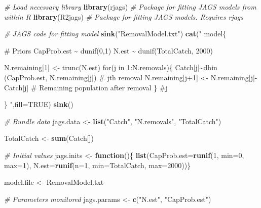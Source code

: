 \documentclass[
]{krantz}
\makeatletter
\newenvironment{Shaded}{\begin{snugshade}}{\end{snugshade}}
\newcommand{\AttributeTok}[1]{\textcolor[rgb]{0.27,0.27,0.27}{#1}}
\newcommand{\CommentTok}[1]{\textcolor[rgb]{0.37,0.37,0.37}{\textit{#1}}}
\newcommand{\ConstantTok}[1]{\textcolor[rgb]{0.37,0.37,0.37}{#1}}
\newcommand{\ControlFlowTok}[1]{\textcolor[rgb]{0.27,0.27,0.27}{\textbf{#1}}}
\newcommand{\DecValTok}[1]{\textcolor[rgb]{0.06,0.06,0.06}{#1}}
\newcommand{\FunctionTok}[1]{\textcolor[rgb]{0.27,0.27,0.27}{\textbf{#1}}}
\newcommand{\NormalTok}[1]{#1}
\newcommand{\OtherTok}[1]{\textcolor[rgb]{0.37,0.37,0.37}{#1}}
\newcommand{\StringTok}[1]{\textcolor[rgb]{0.5,0.5,0.5}{#1}}
\newenvironment{kframe}{%
\medskip{}
\setlength{\fboxsep}{.8em}
 \def\at@end@of@kframe{}%
 \ifinner\ifhmode%
  \def\at@end@of@kframe{\end{minipage}}%
  \begin{minipage}{\columnwidth}%
 \fi\fi%
 \def\FrameCommand##1{\hskip\@totalleftmargin \hskip-\fboxsep
 \colorbox{shadecolor}{##1}\hskip-\fboxsep
     \hskip-\linewidth \hskip-\@totalleftmargin \hskip\columnwidth}%
 \MakeFramed {\advance\hsize-\width
   \@totalleftmargin\z@ \linewidth\hsize
   \@setminipage}}%
 {\par\unskip\endMakeFramed%
 \at@end@of@kframe}
\renewenvironment{Shaded}{\begin{kframe}}{\end{kframe}}
\makeatother
\begin{document}
\begin{Shaded}
\begin{Highlighting}[]
\CommentTok{\# Load necessary library}
\FunctionTok{library}\NormalTok{(rjags)   }\CommentTok{\# Package for fitting JAGS models from within R}
\FunctionTok{library}\NormalTok{(R2jags)  }\CommentTok{\# Package for fitting JAGS models. Requires rjags}

\CommentTok{\# JAGS code for fitting model}
\FunctionTok{sink}\NormalTok{(}\StringTok{"RemovalModel.txt"}\NormalTok{)}
  \FunctionTok{cat}\NormalTok{(}\StringTok{"}
\StringTok{model\{}

\StringTok{\# Priors}
\StringTok{ CapProb.est \textasciitilde{} dunif(0,1)}
\StringTok{ N.est \textasciitilde{} dunif(TotalCatch, 2000)}

\StringTok{ N.remaining[1] \textless{}{-} trunc(N.est)}
\StringTok{ for(j in 1:N.removals)\{}
\StringTok{      Catch[j]\textasciitilde{}dbin (CapProb.est, N.remaining[j]) \# jth removal}
\StringTok{      N.remaining[j+1] \textless{}{-} N.remaining[j]{-}Catch[j] \# Remaining population after removal}
\StringTok{  \} \#j}

\StringTok{\}}
\StringTok{      "}\NormalTok{,}\AttributeTok{fill=}\ConstantTok{TRUE}\NormalTok{)}
  \FunctionTok{sink}\NormalTok{()}

     \CommentTok{\# Bundle data}
\NormalTok{  jags.data }\OtherTok{\textless{}{-}} \FunctionTok{list}\NormalTok{(}\StringTok{"Catch"}\NormalTok{, }\StringTok{"N.removals"}\NormalTok{, }\StringTok{"TotalCatch"}\NormalTok{)}

\NormalTok{  TotalCatch }\OtherTok{\textless{}{-}} \FunctionTok{sum}\NormalTok{(Catch[])}

  \CommentTok{\# Initial values}
\NormalTok{  jags.inits }\OtherTok{\textless{}{-}} \ControlFlowTok{function}\NormalTok{()\{ }\FunctionTok{list}\NormalTok{(}\AttributeTok{CapProb.est=}\FunctionTok{runif}\NormalTok{(}\DecValTok{1}\NormalTok{, }\AttributeTok{min=}\DecValTok{0}\NormalTok{, }\AttributeTok{max=}\DecValTok{1}\NormalTok{),}
                                  \AttributeTok{N.est=}\FunctionTok{runif}\NormalTok{(}\AttributeTok{n=}\DecValTok{1}\NormalTok{, }\AttributeTok{min=}\NormalTok{TotalCatch, }\AttributeTok{max=}\DecValTok{2000}\NormalTok{))\}}

\NormalTok{  model.file }\OtherTok{\textless{}{-}} \StringTok{\textquotesingle{}RemovalModel.txt\textquotesingle{}}

  \CommentTok{\# Parameters monitored}
\NormalTok{  jags.params }\OtherTok{\textless{}{-}} \FunctionTok{c}\NormalTok{(}\StringTok{"N.est"}\NormalTok{, }\StringTok{"CapProb.est"}\NormalTok{)}


\end{Highlighting}
\end{Shaded}
\end{document}
